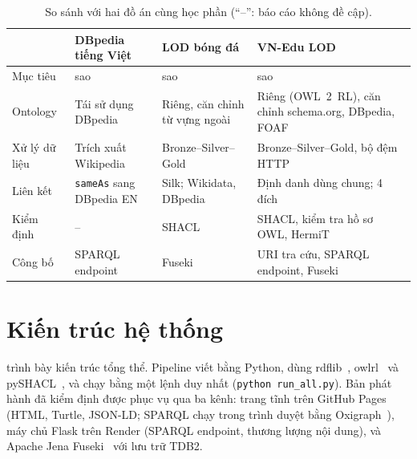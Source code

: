 \documentclass[12pt,a4paper]{article}
\begin{document}
\begin{table}[htbp]
\centering\small
\caption{So sánh với hai đồ án cùng học phần (``--'': báo cáo không đề cập).}\label{tab:related}
\begin{tabularx}{\textwidth}{>{\raggedright\arraybackslash}p{2.6cm}>{\raggedright\arraybackslash}X>{\raggedright\arraybackslash}X>{\raggedright\arraybackslash}X}
\toprule
 & DBpedia tiếng Việt~\cite{ha2025viodbpedia} & LOD bóng đá~\cite{ninh2025football} & VN-Edu LOD \\
\midrule
Mục tiêu & 4 sao & 5 sao & 5 sao \\
Ontology & Tái sử dụng DBpedia & Riêng, căn chỉnh từ vựng ngoài & Riêng (OWL~2~RL), căn chỉnh schema.org, DBpedia, FOAF \\
Xử lý dữ liệu & Trích xuất Wikipedia & Bronze--Silver--Gold & Bronze--Silver--Gold, bộ đệm HTTP \\
Liên kết & \texttt{sameAs} sang DBpedia EN & Silk; Wikidata, DBpedia & Định danh dùng chung; 4 đích \\
Kiểm định & -- & SHACL & SHACL, kiểm tra hồ sơ OWL, HermiT \\
Công bố & SPARQL endpoint & Fuseki & URI tra cứu, SPARQL endpoint, Fuseki \\
\bottomrule
\end{tabularx}
\end{table}

\section{Kiến trúc hệ thống}\label{sec:arch}
 trình bày kiến trúc tổng thể. Pipeline viết bằng Python, dùng rdflib~\cite{rdflib}, owlrl~\cite{owlrl}
và pySHACL~\cite{pyshacl}, và chạy bằng một lệnh duy nhất (\texttt{python run\_all.py}). Bản phát hành đã kiểm định được
phục vụ qua ba kênh: trang tĩnh trên GitHub Pages (HTML, Turtle, JSON-LD; SPARQL chạy trong trình duyệt bằng
Oxigraph~\cite{oxigraph}), máy chủ Flask trên Render (SPARQL endpoint, thương lượng nội dung), và Apache Jena
Fuseki~\cite{jenafuseki} với lưu trữ TDB2.
\end{document}
